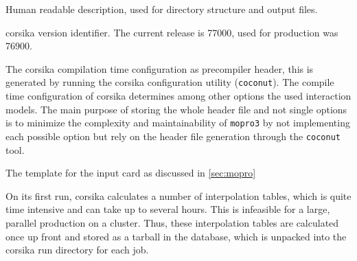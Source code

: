 \begin{description}[font=\ttfamily, itemsep=0.2ex, parsep=0ex]
  \item[id, Integer, PrimaryKey]
  \item[name, Text] Human readable description, used for directory structure and output files.
  \item[version, Integer] \gls{corsika} version identifier. The current release is 77000,
    used for production was 76900.
  \item[config\_h, Text] The \gls{corsika} compilation time configuration as precompiler header,
    this is generated by running the \gls{corsika} configuration utility (\texttt{coconut}).
    The compile time configuration of \gls{corsika} determines among other options the used
    interaction models. 
    The main purpose of storing the whole header file and not single options is to
    minimize the complexity and maintainability of \texttt{mopro3} by not implementing each possible option
    but rely on the header file generation through the \texttt{coconut} tool.
  \item[inputcard\_template, Text] The template for the input card  as discussed in \autoref{sec:mopro}
  \item[addtional\_files, Binary] On its first run, \gls{corsika} calculates a number
    of interpolation tables, which is quite time intensive and can take up to several hours.
    This is infeasible for a large, parallel production on a cluster.
    Thus, these interpolation tables are calculated once up front and stored as a tarball
    in the database, which is unpacked into the \gls{corsika} run directory for each
    job.
\end{description}


